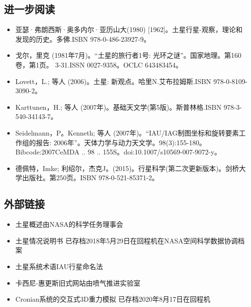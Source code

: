 \subsection{进一步阅读}
\begin{itemize}
\item 亚瑟·弗朗西斯·奥多内尔·亚历山大(1980) [1962]。土星行星-观察，理论和发现的历史。多佛.ISBN 978-0-486-23927-9。
\item 戈尔，里克 (1981年7月)。“土星的旅行者1号: 光环之谜”。国家地理。第160卷，第1页。 3-31.ISSN 0027-9358。OCLC 643483454。
\item Lovett，L.; 等人 (2006)。土星: 新观点。哈里N.艾布拉姆斯.ISBN 978-0-8109-3090-2。
\item Karttunen，H.; 等人 (2007年)。基础天文学(第5版)。斯普林格.ISBN 978-3-540-34143-7。
\item Seidelmann，P。Kenneth; 等人 (2007年)。“IAU/IAG制图坐标和旋转要素工作组的报告: 2006年”。天体力学与动力天文学。98(3):155-180。Bibcode:2007CeMDA .. 98 .. 155S。doi:10.1007/s10569-007-9072-y。
\item 德佩特，Imke; 利绍尔，杰克J。(2015)。行星科学(第二次更新版本)。剑桥大学出版社。第250页。ISBN 978-0-521-85371-2。
\end{itemize}
\subsection{外部链接}
\begin{itemize}
\item 土星概述由NASA的科学任务理事会
\item 土星情况说明书 已存档2018年5月29日在回程机在NASA空间科学数据协调档案
\item 土星系统术语IAU行星命名法
\item 卡西尼-惠更斯旧式网站由喷气推进实验室
\item Cronian系统的交互式3D重力模拟 已存档2020年8月17日在回程机
\end{itemize}








